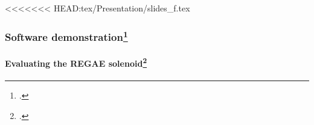 \documentclass[10pt]{beamer}
\newcommand{\rfn}{\setcounter{footnote}{0}}
\begin{document}
<<<<<<< HEAD:tex/Presentation/slides_f.tex
\begin{frame}
  \frametitle{Software demonstration\footcite{repo}}
  \rfn
  \framesubtitle{Evaluating the REGAE solenoid\footcite{Disser}}
  \begin{figure}
    \hspace{-0.5cm}
    \hspace{0.5cm}

  \end{figure}
\end{frame}
\end{document}
